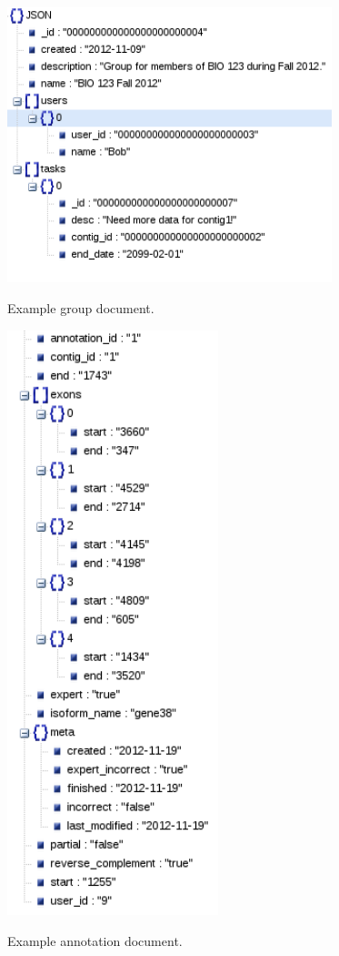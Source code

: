 \documentclass[12pt]{ucthesis}
\newcommand{\captionfonts}{\small\bf\ssp}
\begin{document}
\begin{figure}[H]
\begin{center}
\includegraphics[height=80mm]{group.png}
\captionfonts
\caption[Group Document]{Example group document.}
\label{fig:group-ex}
\end{center}
\end{figure}

\begin{figure}[H]
\begin{center}
\includegraphics[height=170mm]{annotation.png}
\captionfonts
\caption[Annotation Document]{Example annotation document.}
\label{fig:annotation-ex}
\end{center}
\end{figure}
\end{document}
